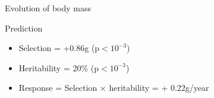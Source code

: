 \documentclass[10pt]{beamer}%
\begin{document}
\begin{frame}{Evolution of body mass}
	\begin{alertblock}{Prediction}
				\begin{itemize}[<+->]
					\item Selection = +0.86g (p$< 10^{-3}$)
					\item Heritability = 20\% (p$ < 10^{-3}$)
					\item Response = Selection $\times$ heritability = + 0.22g/year
				\end{itemize}
			\end{alertblock}
			
\end{frame}
\end{document}
